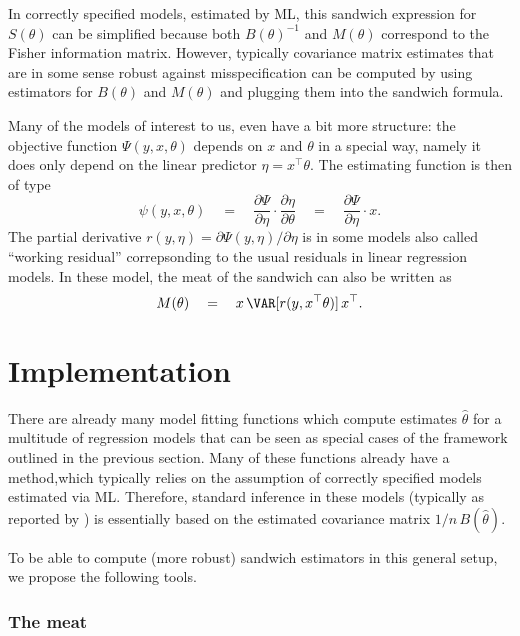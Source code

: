 \documentclass{Z}
\begin{document}
In correctly specified models, estimated by ML, this sandwich expression for
$S(\theta)$ can be simplified because both $B(\theta)^{-1}$ and $M(\theta)$ correspond
to the Fisher information matrix. However, typically covariance matrix estimates that
are in some sense robust against misspecification can be computed by using estimators for
$B(\theta)$ and $M(\theta)$ and plugging them into the sandwich formula.

Many of the models of interest to us, even have a bit more structure: the objective function
$\Psi(y, x, \theta)$ depends on $x$ and $\theta$ in a special way, namely it does only
depend on the linear predictor $\eta = x^\top \theta$. The estimating function is then of type
\begin{equation}
  \psi(y, x, \theta)
    \quad = \quad \frac{\partial \Psi}{\partial \eta} \cdot \frac{\partial \eta}{\partial \theta}
    \quad = \quad \frac{\partial \Psi}{\partial \eta} \cdot x.
\end{equation}
The partial derivative $r(y, \eta) = \partial \Psi(y, \eta) / \partial \eta$ is in some models
also called ``working residual'' correpsonding to the usual residuals in linear regression models.
In these model, the meat of the sandwich can also be written as
\begin{equation} \label{eq:meatHC}
  M(\theta) \quad = \quad x \, \VAR[ r(y, x^\top \theta) ] \, x^\top.
\end{equation}



\section{Implementation}

There are already many model fitting functions which compute estimates $\hat \theta$
for a multitude of regression models that can be seen as special cases of the framework
outlined in the previous section. Many of these functions already have a 
method,which typically relies on the assumption of correctly specified models estimated
via ML. Therefore, standard inference
in these models (typically as reported by ) is essentially based on the estimated
covariance matrix $1/n \, B(\hat \theta)$.

To be able to compute (more robust) sandwich estimators in this general setup, we
propose the following tools. 

\subsubsection*{The meat}
\end{document}
